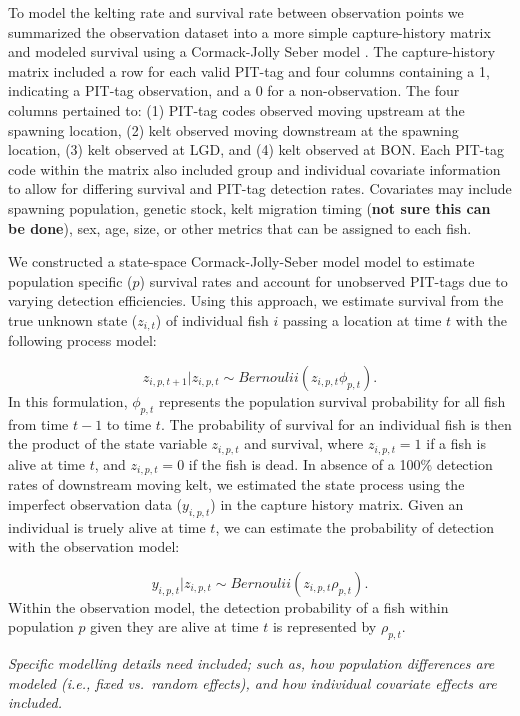 \documentclass[11pt,a4paper,]{article}
\begin{document}
To model the kelting rate and survival rate between observation points we summarized the observation dataset into a more simple capture-history matrix and modeled survival using a Cormack-Jolly Seber model \autocite{lebretonModelingSurvivalTesting1992}. The capture-history matrix included a row for each valid PIT-tag and four columns containing a 1, indicating a PIT-tag observation, and a 0 for a non-observation. The four columns pertained to: (1) PIT-tag codes observed moving upstream at the spawning location, (2) kelt observed moving downstream at the spawning location, (3) kelt observed at LGD, and (4) kelt observed at BON. Each PIT-tag code within the matrix also included group and individual covariate information to allow for differing survival and PIT-tag detection rates. Covariates may include spawning population, genetic stock, kelt migration timing (\textbf{not sure this can be done}), sex, age, size, or other metrics that can be assigned to each fish.

We constructed a state-space Cormack-Jolly-Seber model \autocite{royleHierarchicalModelingInference2008} model to estimate population specific (\(p\)) survival rates and account for unobserved PIT-tags due to varying detection efficiencies. Using this approach, we estimate survival from the true unknown state (\(z_{i,t}\)) of individual fish \(i\) passing a location at time \(t\) with the following process model:

\[
z_{i,p,t+1}|z_{i,p,t} \sim Bernoulii(z_{i,p,t} \phi_{p,t}).
\]
In this formulation, \(\phi_{p,t}\) represents the population survival probability for all fish from time \(t - 1\) to time \(t\). The probability of survival for an individual fish is then the product of the state variable \(z_{i,p,t}\) and survival, where \(z_{i,p,t}=1\) if a fish is alive at time \(t\), and \(z_{i,p,t}=0\) if the fish is dead. In absence of a 100\% detection rates of downstream moving kelt, we estimated the state process using the imperfect observation data (\(y_{i,p,t}\)) in the capture history matrix. Given an individual is truely alive at time \(t\), we can estimate the probability of detection with the observation model:

\[
y_{i,p,t}|z_{i,p,t} \sim Bernoulii(z_{i,p,t} \rho_{p,t}).
\]
Within the observation model, the detection probability of a fish within population \(p\) given they are alive at time \(t\) is represented by \(\rho_{p,t}\).

\emph{Specific modelling details need included; such as, how population differences are modeled (i.e., fixed vs.~random effects), and how individual covariate effects are included.}
\end{document}
